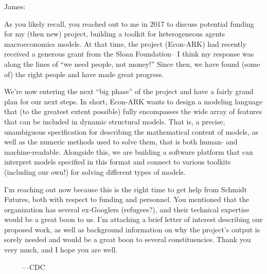 \documentclass[12pt,pdftex,letterpaper]{article}
\begin{document}
	\pagestyle{empty}
	
James:

As you likely recall, you reached out to me in 2017 to discuss potential funding for my (then new) project, building a toolkit for heterogeneous agents macroeconomics models. At that time, the project (Econ-ARK) had recently received a generous grant from the Sloan Foundation-- I think my response was along the lines of ``we need people, not money!'' Since then, we have found (some of) the right people and have made great progress.

We're now entering the next ``big phase'' of the project and have a fairly grand plan for our next steps. In short, Econ-ARK wants to design a modeling language that (to the greatest extent possible) fully encompasses the wide array of features that can be included in dynamic structural models. That is, a precise, unambiguous specification for describing the mathematical content of models, as well as the numeric methods used to solve them, that is both human- and machine-readable. Alongside this, we are building a software platform that can interpret models specified in this format and connect to various toolkits (including our own!) for solving different types of models.

I'm reaching out now because this is the right time to get help from Schmidt Futures, both with respect to funding and personnel. You mentioned that the organization has several ex-Googlers (refugees?), and their technical expertise would be a great boon to us. I'm attaching a brief letter of interest describing our proposed work, as well as background information on why the project's output is sorely needed and would be a great boon to several constituencies. Thank you very much, and I hope you are well.

~~~~~---CDC
\end{document}
